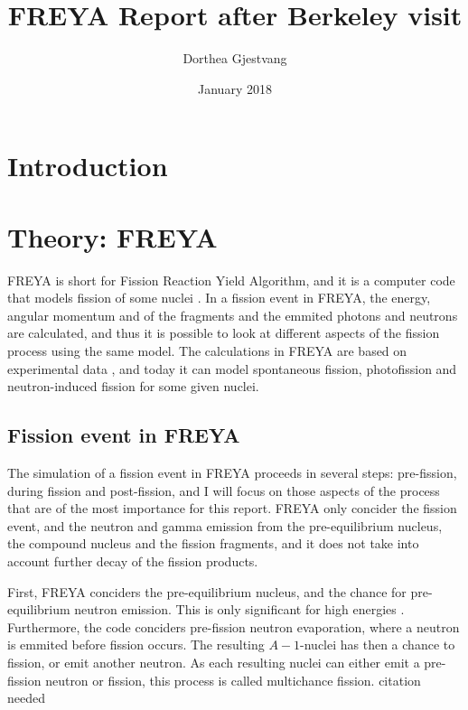 \documentclass[]{article}
\title{}
\author{}
\begin{document}
	
\title{FREYA Report after Berkeley visit}
\author{Dorthea Gjestvang}
\date{January 2018}

\maketitle

\section{Introduction}

\section{Theory: FREYA}
FREYA is short for Fission Reaction Yield Algorithm, and it is a computer code that models fission of some nuclei \cite{FREYAusemanual}. In a fission event in FREYA, the energy, angular momentum and of the fragments and the emmited photons and neutrons are calculated, and thus it is possible to look at different aspects of the fission process using the same model. The calculations in FREYA are based on experimental data \cite{FREYAusemanual}, and today it can model spontaneous fission, photofission and neutron-induced fission for some given nuclei.

\subsection{Fission event in FREYA}

The simulation of a fission event in FREYA proceeds in several steps: pre-fission, during fission and post-fission, and I will focus on those aspects of the process that are of the most importance for this report. FREYA only concider the fission event, and the neutron and gamma emission from the pre-equilibrium nucleus, the compound nucleus and the fission fragments, and it does not take into account further decay of the fission products.

First, FREYA conciders the pre-equilibrium nucleus, and the chance for pre-equilibrium neutron emission. This is only significant for high energies \cite{FREYAusemanual}. Furthermore, the code conciders pre-fission neutron evaporation, where a neutron is emmited before fission occurs. The resulting $A-1$-nuclei has then a chance to fission, or emit another neutron. As each resulting nuclei can either emit a pre-fission neutron or fission, this process is called multichance fission. {citation needed}
\end{document}
